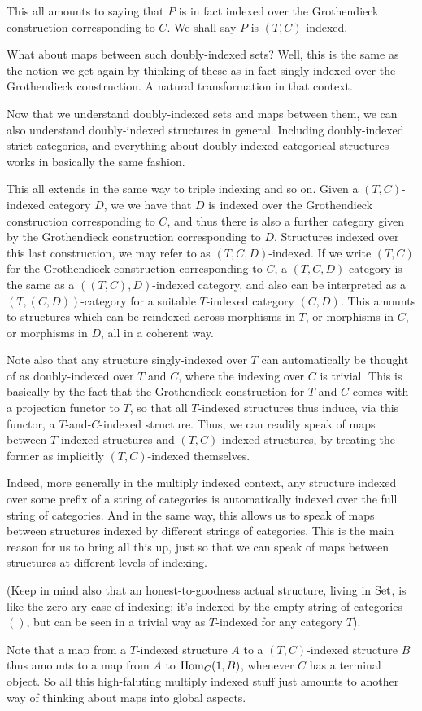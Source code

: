 This all amounts to saying that $P$ is in fact indexed over the Grothendieck construction corresponding to $C$. We shall say $P$ is $(T, C)$-indexed.

What about maps between such doubly-indexed sets? Well, this is the same as the notion we get again by thinking of these as in fact singly-indexed over the Grothendieck construction. A natural transformation in that context.

Now that we understand doubly-indexed sets and maps between them, we can also understand doubly-indexed structures in general. Including doubly-indexed strict categories, and everything about doubly-indexed categorical structures works in basically the same fashion.

This all extends in the same way to triple indexing and so on. Given a $(T, C)$-indexed category $D$, we we have that $D$ is indexed over the Grothendieck construction corresponding to $C$, and thus there is also a further category given by the Grothendieck construction corresponding to $D$. Structures indexed over this last construction, we may refer to as $(T, C, D)$-indexed. If we write $(T, C)$ for the Grothendieck construction corresponding to $C$, a $(T, C, D)$-category is the same as a $((T, C), D)$-indexed category, and also can be interpreted as a $(T, (C, D))$-category for a suitable $T$-indexed category $(C, D)$. This amounts to structures which can be reindexed across morphisms in $T$, or  morphisms in $C$, or morphisms in $D$, all in a coherent way.


Note also that any structure singly-indexed over $T$ can automatically be thought of as doubly-indexed over $T$ and $C$, where the indexing over $C$ is trivial. This is basically by the fact that the Grothendieck construction for $T$ and $C$ comes with a projection functor to $T$, so that all $T$-indexed structures thus induce, via this functor, a $T$-and-$C$-indexed structure. Thus, we can readily speak of maps between $T$-indexed structures and $(T, C)$-indexed structures, by treating the former as implicitly $(T, C)$-indexed themselves.

Indeed, more generally in the multiply indexed context, any structure indexed over some prefix of a string of categories is automatically indexed over the full string of categories. And in the same way, this allows us to speak of maps between structures indexed by different strings of categories. This is the main reason for us to bring all this up, just so that we can speak of maps between structures at different levels of indexing.

(Keep in mind also that an honest-to-goodness actual structure, living in $\mathrm{Set}$, is like the zero-ary case of indexing; it's indexed by the empty string of categories $()$, but can be seen in a trivial way as $T$-indexed for any category $T$).

Note that a map from a $T$-indexed structure $A$ to a $(T, C)$-indexed structure $B$ thus amounts to a map from $A$ to $\operatorname{Hom}_C(1, B)$, whenever $C$ has a terminal object. So all this high-faluting multiply indexed stuff just amounts to another way of thinking about maps into global aspects.
